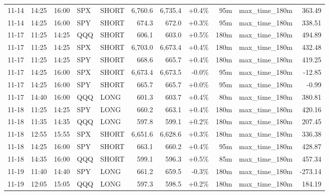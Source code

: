 \documentclass[11pt,a4paper,twoside]{article}
\begin{document}
\begin{center}
\begin{longtable}{>{\color{txtmain}}l l l l l r r r r >{\color{txtmain}}l r}
11-14 & 14:25 & 16:00 & SPX & SHORT & 6,760.6 & 6,735.4 & \textcolor{wingreen}{+0.4\%} & 95m & max\_time\_180m & \textcolor{wingreen}{363.49} \\
11-14 & 14:25 & 16:00 & SPY & SHORT & 674.3 & 672.0 & \textcolor{wingreen}{+0.3\%} & 95m & max\_time\_180m & \textcolor{wingreen}{338.51} \\
11-17 & 11:25 & 14:25 & QQQ & SHORT & 606.1 & 603.0 & \textcolor{wingreen}{+0.5\%} & 180m & max\_time\_180m & \textcolor{wingreen}{494.89} \\
11-17 & 11:25 & 14:25 & SPX & SHORT & 6,703.0 & 6,673.4 & \textcolor{wingreen}{+0.4\%} & 180m & max\_time\_180m & \textcolor{wingreen}{432.48} \\
11-17 & 11:25 & 14:25 & SPY & SHORT & 668.6 & 665.7 & \textcolor{wingreen}{+0.4\%} & 180m & max\_time\_180m & \textcolor{wingreen}{419.25} \\
11-17 & 14:25 & 16:00 & SPX & SHORT & 6,673.4 & 6,673.5 & \textcolor{lossred}{-0.0\%} & 95m & max\_time\_180m & \textcolor{lossred}{-12.85} \\
11-17 & 14:25 & 16:00 & SPY & SHORT & 665.7 & 665.7 & \textcolor{wingreen}{+0.0\%} & 95m & max\_time\_180m & \textcolor{lossred}{-0.99} \\
11-17 & 14:40 & 16:00 & QQQ & LONG & 601.3 & 603.7 & \textcolor{wingreen}{+0.4\%} & 80m & max\_time\_180m & \textcolor{wingreen}{380.81} \\
11-18 & 11:25 & 14:25 & SPY & LONG & 660.2 & 663.1 & \textcolor{wingreen}{+0.4\%} & 180m & max\_time\_180m & \textcolor{wingreen}{420.16} \\
11-18 & 11:35 & 14:35 & QQQ & LONG & 597.8 & 599.1 & \textcolor{wingreen}{+0.2\%} & 180m & max\_time\_180m & \textcolor{wingreen}{207.45} \\
11-18 & 12:55 & 15:55 & SPX & SHORT & 6,651.6 & 6,628.6 & \textcolor{wingreen}{+0.3\%} & 180m & max\_time\_180m & \textcolor{wingreen}{336.38} \\
11-18 & 14:25 & 16:00 & SPY & SHORT & 663.1 & 660.2 & \textcolor{wingreen}{+0.4\%} & 95m & max\_time\_180m & \textcolor{wingreen}{428.87} \\
11-18 & 14:35 & 16:00 & QQQ & SHORT & 599.1 & 596.3 & \textcolor{wingreen}{+0.5\%} & 85m & max\_time\_180m & \textcolor{wingreen}{457.34} \\
11-19 & 11:40 & 14:40 & SPY & LONG & 661.2 & 659.5 & \textcolor{lossred}{-0.3\%} & 180m & max\_time\_180m & \textcolor{lossred}{-273.14} \\
11-19 & 12:05 & 15:05 & QQQ & LONG & 597.3 & 598.5 & \textcolor{wingreen}{+0.2\%} & 180m & max\_time\_180m & \textcolor{wingreen}{184.19} \\

\end{longtable}
\end{center}
\end{document}
